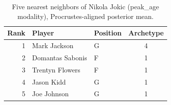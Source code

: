 \begin{table}[htbp]
  \centering\small
  \begin{tabular}{rllc}
    \toprule
    Rank & Player & Position & Archetype \\
    \midrule
    1 & Mark Jackson & G & 4 \\
    2 & Domantas Sabonis & F & 1 \\
    3 & Trentyn Flowers & F & 1 \\
    4 & Jason Kidd & G & 1 \\
    5 & Joe Johnson & G & 1 \\
    \bottomrule
  \end{tabular}
  \caption{Five nearest neighbors of Nikola Jokic (peak_age modality), Procrustes-aligned posterior mean.}
  \label{tab:Nikola_Jokic_neighbors_peak_age}
\end{table}

